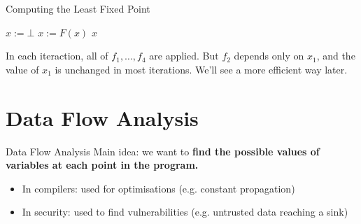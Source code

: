 \documentclass[aspectratio=169,xcolor=dvipsnames]{beamer}
\begin{document}

\begin{frame}[fragile]{Computing the Least Fixed Point}

	\begin{algorithm}[H]
		\begin{algorithmic}[1]
			\State $x := \bot$
			\State $x := F(x)$
			\EndWhile
			\State \Return $x$
			\EndProcedure
		\end{algorithmic}
		\caption{Naive Fixed Point Algorithm}
	\end{algorithm}

	In each iteraction, all of $f_1, \ldots, f_4$ are applied. But $f_2$ depends
	only on $x_1$, and the value of $x_1$ is unchanged in most iterations. We'll
	see a more efficient way later.
\end{frame}

\section{Data Flow Analysis}

\begin{frame}{Data Flow Analysis}
	Main idea: we want to {\bf find the possible values of variables at each point in the program.}

	\bigskip
	\begin{itemize}
		\item In compilers: used for optimisations (e.g. constant propagation)
		\item In security: used to find vulnerabilities (e.g. untrusted data reaching a sink)
	\end{itemize}
\end{frame}

\end{document}

